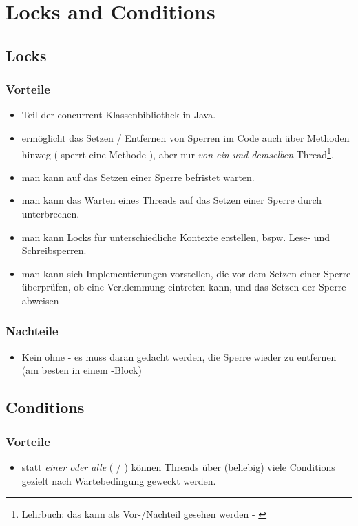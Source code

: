\section{Locks and Conditions}

\subsection{Locks}

\subsubsection*{Vorteile}

\begin{itemize}
    \item Teil der concurrent-Klassenbibliothek in Java.
    \item ermöglicht das Setzen  / Entfernen  von Sperren im Code auch über Methoden hinweg ( sperrt eine Methode ), aber nur \textit{von ein und demselben} Thread\footnote{Lehrbuch: das kann als Vor-/Nachteil gesehen werden - \cite[149]{Oec22}}.
    \item man kann auf das Setzen einer Sperre befristet warten.
    \item man kann das Warten eines Threads auf das Setzen einer Sperre durch  unterbrechen.
    \item man kann Locks für unterschiedliche Kontexte erstellen, bspw. Lese- und Schreibsperren.
    \item man kann sich Implementierungen vorstellen, die vor dem Setzen einer Sperre überprüfen, ob eine Verklemmung eintreten kann, und das Setzen der Sperre abweisen
\end{itemize}


\subsubsection*{Nachteile}
\begin{itemize}
    \item Kein  ohne  - es muss daran gedacht werden, die Sperre wieder zu entfernen (am besten in einem -Block)
\end{itemize}

\subsection{Conditions}

\subsubsection*{Vorteile}

\begin{itemize}
    \item statt \textit{einer oder alle} ( / ) können Threads über (beliebig) viele Conditions gezielt nach Wartebedingung geweckt werden.
\end{itemize}
